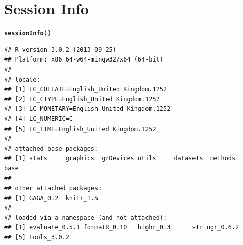 \documentclass[a4paper]{article}\usepackage[]{graphicx}\usepackage[]{color}
\makeatletter
\newcommand{\hlstd}[1]{\textcolor[rgb]{0.345,0.345,0.345}{#1}}%
\newcommand{\hlkwd}[1]{\textcolor[rgb]{0.737,0.353,0.396}{\textbf{#1}}}%
\newenvironment{kframe}{%
 \def\at@end@of@kframe{}%
 \ifinner\ifhmode%
  \def\at@end@of@kframe{\end{minipage}}%
  \begin{minipage}{\columnwidth}%
 \fi\fi%
 \def\FrameCommand##1{\hskip\@totalleftmargin \hskip-\fboxsep
 \colorbox{shadecolor}{##1}\hskip-\fboxsep
     \hskip-\linewidth \hskip-\@totalleftmargin \hskip\columnwidth}%
 \MakeFramed {\advance\hsize-\width
   \@totalleftmargin\z@ \linewidth\hsize
   \@setminipage}}%
 {\par\unskip\endMakeFramed%
 \at@end@of@kframe}
\newenvironment{knitrout}{}{} %
\makeatother
\begin{document}
\section{Session Info}
\begin{knitrout}
\color{fgcolor}\begin{kframe}
\begin{alltt}
\hlkwd{sessionInfo}\hlstd{()}
\end{alltt}
\begin{verbatim}
## R version 3.0.2 (2013-09-25)
## Platform: x86_64-w64-mingw32/x64 (64-bit)
## 
## locale:
## [1] LC_COLLATE=English_United Kingdom.1252 
## [2] LC_CTYPE=English_United Kingdom.1252   
## [3] LC_MONETARY=English_United Kingdom.1252
## [4] LC_NUMERIC=C                           
## [5] LC_TIME=English_United Kingdom.1252    
## 
## attached base packages:
## [1] stats     graphics  grDevices utils     datasets  methods   base     
## 
## other attached packages:
## [1] GAGA_0.2  knitr_1.5
## 
## loaded via a namespace (and not attached):
## [1] evaluate_0.5.1 formatR_0.10   highr_0.3      stringr_0.6.2 
## [5] tools_3.0.2
\end{verbatim}
\end{kframe}
\end{knitrout}



\printbibliography[heading=bibintoc] 
\end{document}
